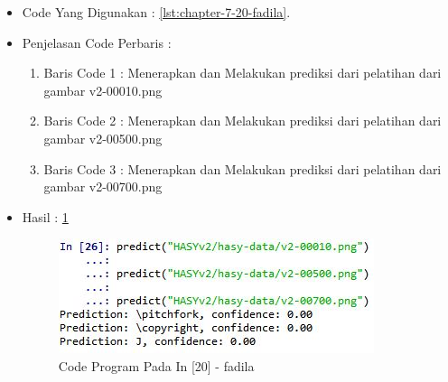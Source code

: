 \begin{enumerate}
\begin{itemize}
\item Code Yang Digunakan : \ref{lst:chapter-7-20-fadila}.

\par
\par
\item Penjelasan Code Perbaris	: 
\begin{enumerate}
\item Baris Code 1	: Menerapkan dan Melakukan prediksi dari pelatihan dari gambar v2-00010.png
\item Baris Code 2	: Menerapkan dan Melakukan prediksi dari pelatihan dari gambar v2-00500.png
\item Baris Code 3	: Menerapkan dan Melakukan prediksi dari pelatihan dari gambar v2-00700.png
\end{enumerate}
\par
\item Hasil : \ref{chapter-7-in-20-fadila}
\par
\par
\begin{figure}[!hbtp]
\centering
\includegraphics[scale=0.4]{figures/chapter-7-in-20-fadila.jpg}
\caption{Code Program Pada In [20] - fadila}
\label{chapter-7-in-20-fadila}
\end{figure}
\par
\par
\end{itemize}
\par
\par
\par
\end{enumerate}


